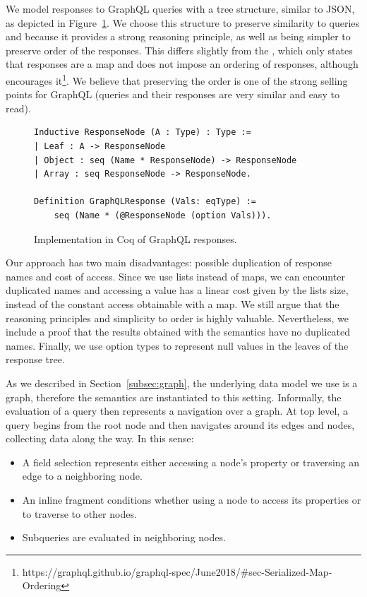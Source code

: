 We model responses to GraphQL queries with a tree structure, similar to JSON, as depicted in Figure~\ref{fig:responses}. We choose this structure to preserve similarity to queries and because it provides a strong reasoning principle, as well as being simpler to preserve order of the responses. This differs slightly from the \spec{}, which only states that responses are a map and does not impose an ordering of responses, although encourages it\footnote{https://graphql.github.io/graphql-spec/June2018/\#sec-Serialized-Map-Ordering}. We believe that preserving the order is one of the strong selling points for GraphQL (queries and their responses are very similar and easy to read). 

\begin{figure}[h]
\begin{verbatim}
Inductive ResponseNode (A : Type) : Type :=
| Leaf : A -> ResponseNode
| Object : seq (Name * ResponseNode) -> ResponseNode
| Array : seq ResponseNode -> ResponseNode.

Definition GraphQLResponse (Vals: eqType) :=
    seq (Name * (@ResponseNode (option Vals))).
\end{verbatim}
\caption{Implementation in Coq of GraphQL responses.}
\label{fig:responses}
\end{figure}

 Our approach has two main disadvantages: possible duplication of response names and cost of access. Since we use lists instead of maps, we can encounter duplicated names and accessing a value has a linear cost given by the lists size, instead of the constant access obtainable with a map. We still argue that the reasoning principles and simplicity to order is highly valuable. Nevertheless, we include a proof that the results obtained with the semantics have no duplicated names. Finally, we use option types to represent null values in the leaves of the response tree.



As we described in Section~\ref{subsec:graph}, the underlying data model we use is a graph, therefore the semantics are instantiated to this setting. %
Informally, the evaluation of a query then represents a navigation over a graph. At top level, a query begins from the root node and then navigates around its edges and nodes, collecting data along the way. In this sense:
\begin{itemize}
    \item A field selection represents either accessing a node's property or traversing an edge to a neighboring node.
    \item An inline fragment conditions whether using a node to access its properties or to traverse to other nodes.
    \item Subqueries are evaluated in neighboring nodes.
\end{itemize}


